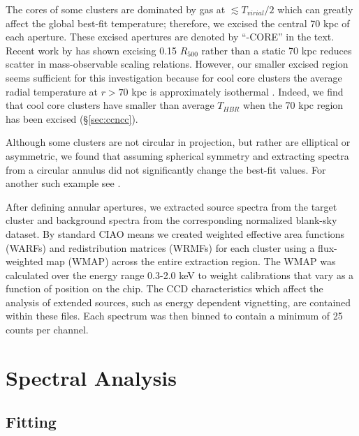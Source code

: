 \documentclass[apj]{emulateapj}
\begin{document}
The cores of some clusters are dominated by gas at $\lesssim
T_{virial}/2$ which can greatly affect the global best-fit
temperature; therefore, we excised the central 70 kpc of each
aperture. These excised apertures are denoted by ``-CORE'' in the
text. Recent work by \cite{2007astro.ph..3504M} has shown excising
0.15 $R_{500}$ rather than a static 70 kpc reduces scatter in
mass-observable scaling relations. However, our smaller excised region
seems sufficient for this investigation because for cool core clusters
the average radial temperature at $r > 70$ kpc is approximately
isothermal \citep{2005ApJ...628..655V}. Indeed, we find that cool core
clusters have smaller than average $T_{HBR}$ when the 70 kpc region
has been excised (\S\ref{sec:ccncc}).

Although some clusters are not circular in projection, but rather are
elliptical or asymmetric, we found that assuming spherical symmetry
and extracting spectra from a circular annulus did not significantly
change the best-fit values. For another such example see
\cite{2005MNRAS.359.1481B}.

After defining annular apertures, we extracted source spectra from the
target cluster and background spectra from the corresponding
normalized blank-sky dataset. By standard {\textsc{CIAO}} means we
created weighted effective area functions (WARFs) and redistribution
matrices (WRMFs) for each cluster using a flux-weighted map (WMAP)
across the entire extraction region. The WMAP was calculated over the
energy range 0.3-2.0 keV to weight calibrations that vary as a
function of position on the chip. The CCD characteristics which affect
the analysis of extended sources, such as energy dependent vignetting,
are contained within these files. Each spectrum was then binned to
contain a minimum of 25 counts per channel.

\section{Spectral Analysis} \label{sec:specan}

\subsection{Fitting} \label{sec:fitting}
\end{document}
